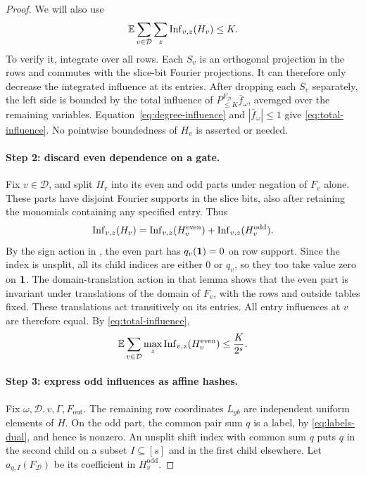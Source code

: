 \begin{proof}
We will also use
\begin{equation}\label{eq:total-influence}
 \mathbb E\sum_{v\in\mathcal D}\sum_z\operatorname{Inf}_{v,z}(H_v)\le K.
\end{equation}
To verify it, integrate over all rows. Each $S_v$ is an orthogonal
projection in the rows and commutes with the slice-bit Fourier projections.
It can therefore only decrease the integrated influence at its entries.
After dropping each $S_v$ separately, the left side is bounded by the
total influence of $P_{\le K}^{F_{\mathcal D}}\bar f_\omega$, averaged over
the remaining variables. Equation~\eqref{eq:degree-influence} and
$|\bar f_\omega|\le1$ give \eqref{eq:total-influence}.
No pointwise boundedness of $H_v$ is asserted or needed.

\paragraph{Step 2: discard even dependence on a gate.}
Fix $v\in\mathcal D$, and split $H_v$ into its even and odd parts under
negation of $F_v$ alone. These parts have disjoint Fourier supports in the
slice bits, also after retaining the monomials containing any specified
entry. Thus
\[
 \operatorname{Inf}_{v,z}(H_v)=
 \operatorname{Inf}_{v,z}(H_v^{\mathrm{even}})
 +\operatorname{Inf}_{v,z}(H_v^{\mathrm{odd}}).
\]
By the sign action in , the even part has
$q_v(\mathbf 1)=0$ on row support. Since the index is unsplit, all its child
indices are either $0$ or $q_v$, so they too take value zero on $\mathbf 1$.
The domain-translation action in that lemma shows that the even part is
invariant under translations of the domain of $F_v$, with the rows and
outside tables fixed. These translations act transitively on its entries.
All entry influences at $v$ are therefore equal. By
\eqref{eq:total-influence},
\begin{equation}\label{eq:even-influence}
 \mathbb E\sum_{v\in\mathcal D}
 \max_z\operatorname{Inf}_{v,z}(H_v^{\mathrm{even}})\le\frac{K}{2^s}.
\end{equation}

\paragraph{Step 3: express odd influences as affine hashes.}
Fix $\omega,\mathcal D,v,\Gamma,F_{\mathrm{out}}$. The remaining row
coordinates $L_{gb}$ are independent uniform elements of $H$. On the odd
part, the common pair sum $q$ is a label, by
\eqref{eq:labels-dual}, and hence is nonzero. An unsplit shift index with
common sum $q$ puts $q$
in the second child on a subset $I\subseteq[s]$ and in the first child
elsewhere. Let $a_{q,I}(F_{\mathcal D})$ be its coefficient in
$H_v^{\mathrm{odd}}$.


\end{proof}

